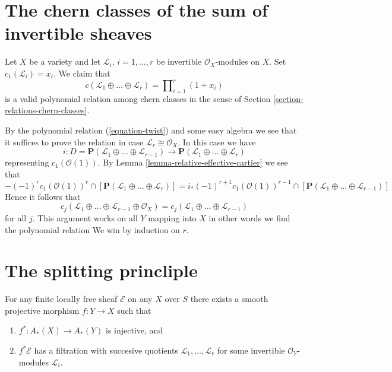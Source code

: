\section{The chern classes of the sum of invertible sheaves}
\label{section-chern-sum-linebundles}

\noindent
Let $X$ be a variety and let ${\mathcal L}_i$,
$i = 1, \ldots, r$ be invertible ${\mathcal O}_X$-modules on $X$. Set
$c_1({\mathcal L}_i) = x_i$. We claim that
$$
c({\mathcal L}_1 \oplus \ldots \oplus {\mathcal L}_r)
=
\prod\nolimits_{i = 1}^r (1 + x_i) 
$$
is a valid polynomial relation among chern classes in the sense of
Section \ref{section-relations-chern-classes}.

\medskip\noindent
By the polynomial relation (\ref{equation-twist}) and some easy
algebra we see that it suffices to prove the relation in case
$\mathcal{L}_r \cong \mathcal{O}_X$. In this case we have
$$
i : D = \mathbf{P}({\mathcal L}_1 \oplus \ldots \oplus {\mathcal L}_{r - 1})
\to
\mathbf{P}({\mathcal L}_1 \oplus \ldots \oplus {\mathcal L}_r)
$$
representing $c_1(\mathcal{O}(1))$. By
Lemma \ref{lemma-relative-effective-cartier} we see that
$$
-(-1)^r c_1(\mathcal{O}(1))^r \cap
[\mathbf{P}({\mathcal L}_1 \oplus \ldots \oplus {\mathcal L}_r)]
=
i_* (-1)^{r + 1} c_1(\mathcal{O}(1))^{r - 1} \cap
[\mathbf{P}({\mathcal L}_1 \oplus \ldots \oplus {\mathcal L}_{r - 1})]
$$
Hence it follows that
$$
c_j({\mathcal L}_1 \oplus \ldots \oplus
\mathcal{L}_{r - 1} \oplus {\mathcal O}_X)
=
c_j({\mathcal L}_1 \oplus \ldots \oplus {\mathcal L}_{r - 1})
$$
for all $j$. This argument works on all $Y$ mapping into $X$ in other
words we find the polynomial relation
We win by induction on $r$.




\section{The splitting princliple}
\label{section-splitting-principle}

\noindent
For any finite locally free sheaf ${\mathcal E}$ on any $X$
over $S$ there exists a smooth projective morphism
$f : Y \to X$ such that
\begin{enumerate}
\item $f^* : A_*(X) \to A_*(Y)$ is injective, and
\item $f^*{\mathcal E}$ has a filtration
with succesive quotients ${\mathcal L}_1, \ldots, {\mathcal L}_r$
for some invertible ${\mathcal O}_Y$-modules ${\mathcal L}_i$.
\end{enumerate}




